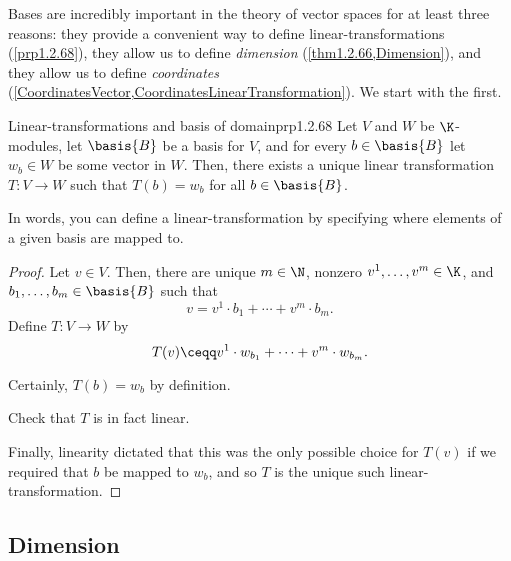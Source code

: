 Bases are incredibly important in the theory of vector spaces for at least three reasons:  they provide a convenient way to define linear-transformations (\cref{prp1.2.68}), they allow us to define \emph{dimension} (\cref{thm1.2.66,Dimension}), and they allow us to define \emph{coordinates} (\cref{CoordinatesVector,CoordinatesLinearTransformation}).  We start with the first.
\begin{prp}{Linear-transformations and basis of domain}{prp1.2.68}
	Let $V$ and $W$ be $\K$-modules, let $\basis{B}$ be a basis for $V$, and for every $b\in \basis{B}$ let $w_b\in W$ be some vector in $W$.  Then, there exists a unique linear transformation $T\colon V\rightarrow W$ such that $T(b)=w_b$ for all $b\in \basis{B}$.
	\begin{rmk}
		In words, you can define a linear-transformation by specifying where elements of a given basis are mapped to.
	\end{rmk}
	\begin{proof}
		Let $v\in V$.  Then, there are unique $m\in \N$, nonzero $v^1,\ldots ,v^m\in \K$, and $b_1,\ldots ,b_m\in \basis{B}$ such that
		\begin{equation}
			v=v^1\cdot b_1+\cdots +v^m\cdot b_m.
		\end{equation}
		Define $T\colon V\rightarrow W$ by
		\begin{equation}
			T(v)\ceqq v^1\cdot w_{b_1}+\cdots +v^m\cdot w_{b_m}.
		\end{equation}
		
		Certainly, $T(b)=w_b$ by definition.
		\begin{exr}[breakable=false]{}{}
			Check that $T$ is in fact linear.		
		\end{exr}
		Finally, linearity dictated that this was the only possible choice for $T(v)$ if we required that $b$ be mapped to $w_b$, and so $T$ is the unique such linear-transformation.
	\end{proof}
\end{prp}

\subsection{Dimension}

